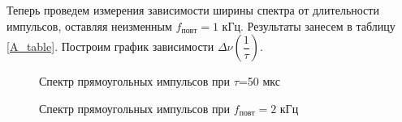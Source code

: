 \documentclass[a4paper, 14pt]{extarticle}%
\begin{document}
  Теперь проведем измерения зависимости ширины спектра от длительности импульсов, оставляя неизменным $ f_{повт} = 1 $ кГц. Результаты занесем в таблицу \ref{A_table}. Построим график зависимости $ \Delta \nu \left (\dfrac{1} {\tau} \right ) $. 
  \begin{figure}[h!]
  	\begin{minipage}[h]{0.5\linewidth}
  		\caption{Спектр прямоугольных импульсов при $\tau$=50 мкс}
  		\label{A_tau}
  	\end{minipage}
  	\begin{minipage}[h]{0.5\linewidth}
  		\caption{Спектр прямоугольных импульсов при $f_{повт}=2$ кГц}
  		\label{A_f}
  	\end{minipage}
  \end{figure}
  	
\end{document}
